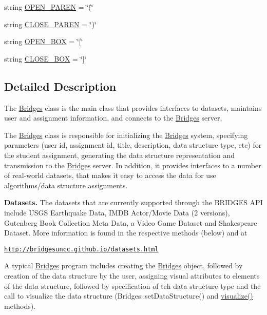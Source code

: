 \begin{DoxyCompactItemize}
\item 
string \hyperlink{class_bridges_1_1_bridges_1_1_bridges_a0224c42589b48d2d24168b15a38735ad}{O\+P\+E\+N\+\_\+\+P\+A\+R\+E\+N} = \char`\"{}(\char`\"{}
\item 
string \hyperlink{class_bridges_1_1_bridges_1_1_bridges_afc31ec8269be6f57b1d2c1a1959c040f}{C\+L\+O\+S\+E\+\_\+\+P\+A\+R\+E\+N} = \char`\"{})\char`\"{}
\item 
string \hyperlink{class_bridges_1_1_bridges_1_1_bridges_ae94282f19974a947191a34c30865c202}{O\+P\+E\+N\+\_\+\+B\+O\+X} = \char`\"{}\mbox{[}\char`\"{}
\item 
string \hyperlink{class_bridges_1_1_bridges_1_1_bridges_abd16a70d55fbcf24b1a29536aae08c7b}{C\+L\+O\+S\+E\+\_\+\+B\+O\+X} = \char`\"{}\mbox{]}\char`\"{}
\end{DoxyCompactItemize}


\subsection{Detailed Description}
The \hyperlink{class_bridges_1_1_bridges_1_1_bridges}{Bridges} class is the main class that provides interfaces to datasets, maintains user and assignment information, and connects to the \hyperlink{class_bridges_1_1_bridges_1_1_bridges}{Bridges} server. 

The \hyperlink{class_bridges_1_1_bridges_1_1_bridges}{Bridges} class is responsible for initializing the \hyperlink{class_bridges_1_1_bridges_1_1_bridges}{Bridges} system, specifying parameters (user id, assignment id, title, description, data structure type, etc) for the student assignment, generating the data structure representation and transmission to the \hyperlink{class_bridges_1_1_bridges_1_1_bridges}{Bridges} server. In addition, it provides interfaces to a number of real-\/world datasets, that makes it easy to access the data for use algorithms/data structure assignments. ~\newline


{\bfseries Datasets.} The datasets that are currently supported through the B\+R\+I\+D\+G\+E\+S A\+P\+I include U\+S\+G\+S Earthquake Data, I\+M\+D\+B Actor/\+Movie Data (2 versions), Gutenberg Book Collection Meta Data, a Video Game Dataset and Shakespeare Dataset. More information is found in the respective methods (below) and at 

\href{http://bridgesuncc.github.io/datasets.html}{\tt http\+://bridgesuncc.\+github.\+io/datasets.\+html} 

A typical \hyperlink{class_bridges_1_1_bridges_1_1_bridges}{Bridges} program includes creating the \hyperlink{class_bridges_1_1_bridges_1_1_bridges}{Bridges} object, followed by creation of the data structure by the user, assigning visual attributes to elements of the data structure, followed by specification of teh data structure type and the call to visualize the data structure (Bridges\+::set\+Data\+Structure() and \hyperlink{class_bridges_1_1_bridges_1_1_bridges_a7503d1902eee682a0661271c070978c1}{visualize()} methods).

